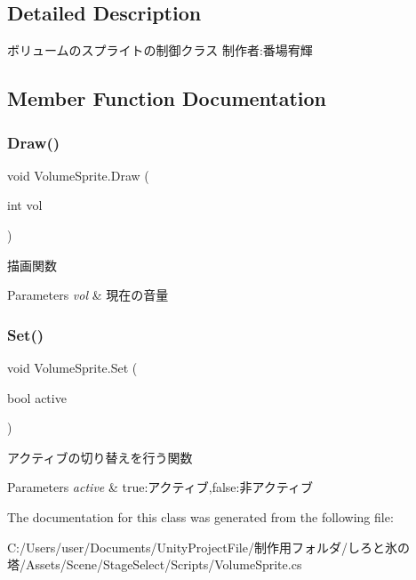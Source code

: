 \subsection{Detailed Description}
ボリュームのスプライトの制御クラス 制作者\+:番場宥輝 



\subsection{Member Function Documentation}
\mbox{\label{class_volume_sprite_a24b4abdf5e733c8c4441a92319d6c73a}} 
\subsubsection{\texorpdfstring{Draw()}{Draw()}}
{\footnotesize\ttfamily void Volume\+Sprite.\+Draw (\begin{DoxyParamCaption}\item[{int}]{vol }\end{DoxyParamCaption})\hspace{0.3cm}{\ttfamily [inline]}}



描画関数 


\begin{DoxyParams}{Parameters}
{\em vol} & 現在の音量\\
\hline
\end{DoxyParams}
\mbox{\label{class_volume_sprite_a33b0a404f6879369596d21e4d6779b28}} 
\subsubsection{\texorpdfstring{Set()}{Set()}}
{\footnotesize\ttfamily void Volume\+Sprite.\+Set (\begin{DoxyParamCaption}\item[{bool}]{active }\end{DoxyParamCaption})\hspace{0.3cm}{\ttfamily [inline]}}



アクティブの切り替えを行う関数 


\begin{DoxyParams}{Parameters}
{\em active} & true\+:アクティブ,false\+:非アクティブ\\
\hline
\end{DoxyParams}


The documentation for this class was generated from the following file\+:\begin{DoxyCompactItemize}
\item 
C\+:/\+Users/user/\+Documents/\+Unity\+Project\+File/制作用フォルダ/しろと氷の塔/\+Assets/\+Scene/\+Stage\+Select/\+Scripts/Volume\+Sprite.\+cs\end{DoxyCompactItemize}
